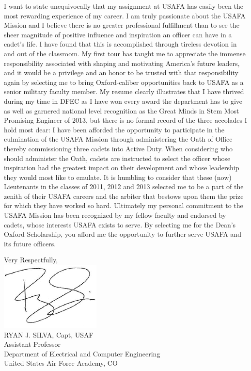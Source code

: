 \documentclass{article}
\begin{document}
I want to state unequivocally that my assignment at USAFA has easily been the
most rewarding experience of my career. I am truly passionate about the USAFA
Mission and I believe there is no greater professional fulfillment than to see
the sheer magnitude of positive influence and inspiration an officer can have
in a cadet's life. I have found that this is accomplished through tireless
devotion in and out of the classroom. My first tour has taught me to appreciate
the immense responsibility associated with shaping and motivating America's
future leaders, and it would be a privilege and an honor to be trusted with
that responsibility again by selecting me to bring Oxford-caliber opportunities
back to USAFA as a senior military faculty member. My resume clearly illustrates that I have thrived during my time in DFEC as I
have won every award the department has to give as well as garnered national
level recognition as the Great Minds in Stem Most Promising Engineer of 2013,
but there is no formal record of the three accolades I hold most dear: I have been
afforded the opportunity to participate in the culmination of the USAFA Mission
through administering the Oath of Office thereby commissioning three cadets into
Active Duty. When considering who should administer the Oath, cadets are
instructed to select the officer whose inspiration had the greatest impact on
their development and whose leadership they would most like to emulate. It is
humbling to consider that these (now) Lieutenants in the classes of 2011, 2012
and 2013 selected me to be a part of the zenith of their USAFA careers and the
arbiter that bestows upon them the prize for which they have worked so hard.
Ultimately my personal commitment to the USAFA Mission has been recognized by
my fellow faculty and endorsed by cadets, whose interests USAFA exists to
serve. By selecting me for the Dean's Oxford Scholarship, you afford me the opportunity
to further serve USAFA and its future officers.

\vspace{10mm}
\hspace*{2.3in} \noindent Very Respectfully, \\
\hspace*{2.5in} \includegraphics[scale=.5]{silvasig}  \\
\hspace*{2.5in} RYAN J. SILVA, Capt, USAF \\
\hspace*{2.5in} Assistant Professor   \\
\hspace*{2.5in} Department of Electrical and Computer Engineering  \\
\hspace*{2.5in} United States Air Force Academy, CO  \\
\renewcommand\contentsname{Attachments}\tableofcontents
\end{document}
